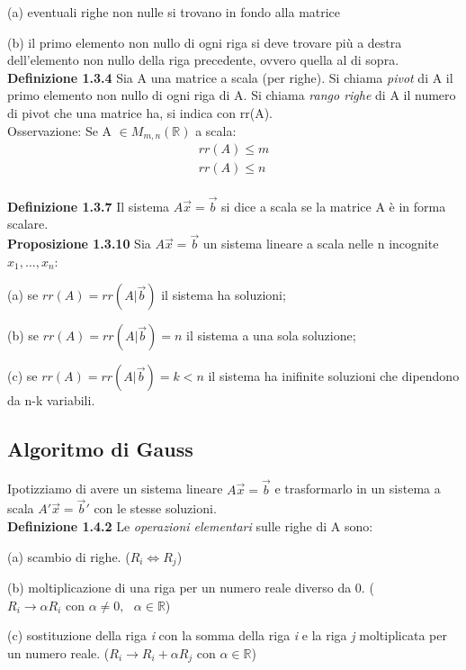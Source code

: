 \documentclass{article}
\begin{document}
\vspace{10px}\par (a) eventuali righe non nulle si trovano in fondo alla matrice
\vspace{5px}\par (b) il primo elemento non nullo di ogni riga si deve trovare più a destra dell'elemento non nullo della riga precedente, ovvero quella al di sopra.
\vspace{1em} \\\textbf{Definizione 1.3.4} Sia A una matrice a scala (per righe). Si chiama \textit{pivot} di A il primo elemento non nullo di ogni riga di A. Si chiama \textit{rango righe} di A il numero di pivot che una matrice ha, si indica con rr(A).
\vspace{3px}\\ Osservazione: Se A $\in M_{m,n}(\mathbb{R})$ a scala:
\begin{align*}
  rr(A) \leq m \\
  rr(A) \leq n
\end{align*}
\vspace{5px} \\\textbf{Definizione 1.3.7} Il sistema \(A\vec{x}=\vec{b}\) si dice a scala se la matrice A è in forma scalare.
\\ \textbf{Proposizione 1.3.10} Sia \(A\vec{x}=\vec{b}\) un sistema lineare a scala nelle n incognite \(x_1,\dots,x_n\):
\vspace{3px}
\par (a) se $rr(A) = rr(A|\vec{b})$ il sistema ha soluzioni;
\par (b) se $rr(A) = rr(A|\vec{b}) = n$ il sistema a una sola soluzione;
\par (c) se $rr(A) = rr(A|\vec{b}) = k < n$ il sistema ha inifinite soluzioni che dipendono da n-k variabili.
\vspace{1em}
\subsection{Algoritmo di Gauss}
Ipotizziamo di avere un sistema lineare \(A\vec{x}=\vec{b}\) e trasformarlo in un sistema a scala \(A'\vec{x}=\vec{b}'\) con le stesse soluzioni.
\\ \textbf{Definizione 1.4.2} Le \textit{operazioni elementari} sulle righe di A sono:
\vspace{3px}
\par (a) scambio di righe. ($R_i \iff R_j$)
\par (b) moltiplicazione di una riga per un numero reale diverso da 0. (\(R_i \to \alpha R_i \text{ con } \alpha \neq 0, \text{ } \alpha \in \mathbb{R}\))
\par (c) sostituzione della riga \textit{i} con la somma della riga \textit{i} e la riga \textit{j} moltiplicata per un numero reale. ($R_i \to R_i + \alpha R_j \text{ con }  \alpha \in \mathbb{R}$)
\end{document}
